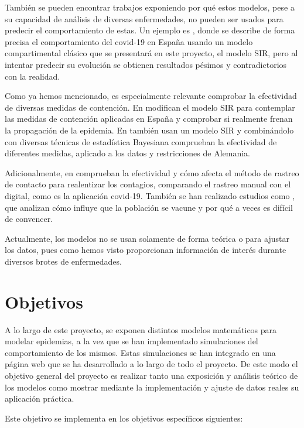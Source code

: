 También se pueden encontrar trabajos exponiendo por qué estos modelos, pese a su capacidad de análisis de diversas enfermedades, no pueden ser usados para predecir el comportamiento de estas. Un ejemplo es \cite{turningpoint}, donde se describe de forma precisa el comportamiento del covid-19 en España usando un modelo compartimental clásico que se presentará en este proyecto, el modelo SIR, pero al intentar predecir su evolución se obtienen resultados pésimos y contradictorios con la realidad.

Como ya hemos mencionado, es especialmente relevante comprobar la efectividad de diversas medidas de contención. En \cite{gutierrez2020analisis} modifican el modelo SIR para contemplar las medidas de contención aplicadas en España y comprobar si realmente frenan la propagación de la epidemia. En \cite{inferringinterventions} también usan un modelo SIR y combinándolo con diversas técnicas de estadística Bayesiana comprueban la efectividad de diferentes medidas, aplicado a los datos y restricciones de Alemania.

Adicionalmente, en \cite{Mancastroppa2021} comprueban la efectividad y cómo afecta el método de rastreo de contacto para realentizar los contagios, comparando el rastreo manual con el digital, como es la aplicación covid-19. También se han realizado estudios como \cite{vaccinationproblem}, que analizan cómo influye que la población se vacune y por qué a veces es difícil de convencer.

Actualmente, los modelos no se usan solamente de forma teórica o para ajustar los datos, pues como hemos visto proporcionan información de interés durante diversos brotes de enfermedades.


\section{Objetivos}

A lo largo de este proyecto, se exponen distintos modelos matemáticos para modelar epidemias, a la vez que se han implementado simulaciones del comportamiento de los mismos. Estas simulaciones se han integrado en una página web que se ha desarrollado a lo largo de todo el proyecto. De este modo el objetivo general del proyecto es realizar tanto una exposición y análisis teórico de los modelos como mostrar mediante la implementación y ajuste de datos reales su aplicación práctica.

Este objetivo se implementa en los objetivos específicos siguientes:

